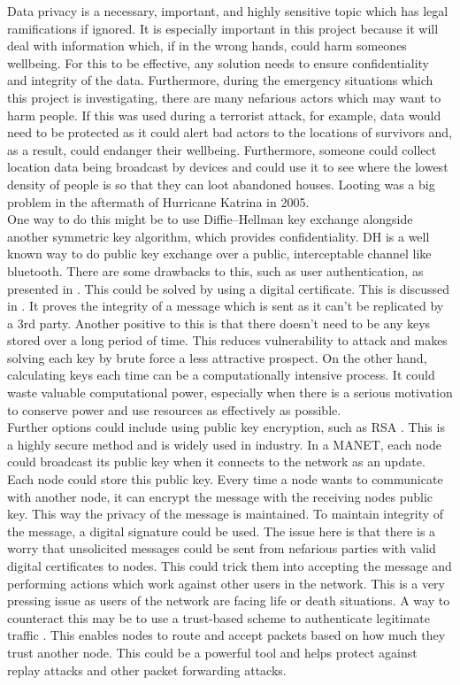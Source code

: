 \documentclass{report}
\begin{document}
Data privacy is a necessary, important, and highly sensitive topic which has legal ramifications if ignored. It is especially important in this project because it will 
deal with information which, if in the wrong hands, could harm someones wellbeing. For this to be effective, any solution needs to ensure confidentiality and integrity of the data.
Furthermore, during the emergency situations which this project is investigating, there are many nefarious actors which may want to harm people. If this was used during a terrorist 
attack, for example, data would need to be protected as it could alert bad actors to the locations of survivors and, as a result, could endanger their wellbeing. Furthermore, someone 
could collect location data being broadcast by devices and could use it to see where the lowest density of people is so that they can loot abandoned houses. Looting was a big problem 
in the aftermath of Hurricane Katrina in 2005\cite{nbcKatrina}.
\bigskip\\
One way to do this might be to use Diffie--Hellman key exchange\cite{li2010research, diffie1976new} alongside another symmetric key algorithm, which provides confidentiality. DH is a well known way to do public key exchange over 
a public, interceptable channel like bluetooth. There are some drawbacks to this, such as user authentication, as presented in \cite{li2010research}. This could be solved by using a digital 
certificate. This is discussed in \cite{diffie1976new}. It proves the integrity of a message which is sent as it can't be replicated by a 3rd party. 
Another positive to this is that there doesn't need to be any keys stored over a long period of time. This reduces vulnerability to attack and makes solving 
each key by brute force a less attractive prospect. On the other hand, calculating keys each time can be a computationally intensive process. It could waste valuable 
computational power, especially when there is a serious motivation to conserve power and use resources as effectively as possible. 
\bigskip\\
Further options could include using public key encryption, such as RSA \cite{aufa2018security}. This is a highly secure method and is widely used in industry. In a MANET, each node could 
broadcast its public key when it connects to the network as an update. Each node could store this public key. Every time a node wants to communicate with another node, it can 
encrypt the message with the receiving nodes public key. This way the privacy of the message is maintained. To maintain integrity of the message, a digital signature could be 
used. The issue here is that there is a worry that unsolicited messages could be sent from nefarious parties with valid digital certificates to nodes. This could trick them 
into accepting the message and performing actions which work against other users in the network. This is a very pressing issue as users of the network are facing life or 
death situations. A way to counteract this may be to use a trust-based scheme to authenticate legitimate traffic \cite{shah2016trust}. This 
enables nodes to route and accept packets based on how much they trust another node. This could be a powerful tool and helps protect against replay attacks and other 
packet forwarding attacks.
\end{document}
